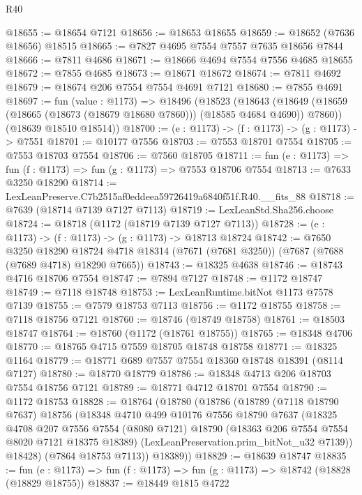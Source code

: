 \begin{lexlean}{R40}
\begin{coremodule}
@18655 := @18654 @7121
@18656 := @18653 @18655
@18659 := @18652 (@7636 @18656) @18515
@18665 := @7827 @4695 @7554 @7557 @7635 @18656 @7844
@18666 := @7811 @4686
@18671 := @18666 @4694 @7554 @7556 @4685 @18655
@18672 := @7855 @4685
@18673 := @18671 @18672
@18674 := @7811 @4692
@18679 := @18674 @206 @7554 @7554 @4691 @7121
@18680 := @7855 @4691
@18697 := fun (value : @1173) =>
  @18496
    (@18523
      (@18643 (@18649 (@18659 (@18665 (@18673 (@18679 @18680 @7860))) (@18585 @4684 @4690)) @7860))
      (@18639 @18510 @18514))
@18700 := (e : @1173) -> (f : @1173) -> (g : @1173) -> @7551
@18701 := @10177 @7556
@18703 := @7553 @18701 @7554
@18705 := @7553 @18703 @7554
@18706 := @7560 @18705
@18711 := fun (e : @1173) => fun (f : @1173) => fun (g : @1173) => @7553 @18706 @7554
@18713 := @7633 @3250 @18290
@18714 := LexLeanPreserve.C7b2515af0eddeea59726419a6840f51f.R40.__fits_88
@18718 := @7639 (@18714 @7139 @7127 @7113)
@18719 := LexLeanStd.Sha256.choose
@18724 := @18718 (@1172 (@18719 @7139 @7127 @7113))
@18728 := (e : @1173) -> (f : @1173) -> (g : @1173) -> @18713 @18724
@18742 := @7650
    @3250
    @18290
    @18724
    @4718
    @18314
    (@7671 (@7681 @3250))
    (@7687 (@7688 (@7689 @4718) @18290 @7665))
@18743 := @18325 @4638
@18746 := @18743 @4716 @18706 @7554
@18747 := @7894 @7127
@18748 := @1172 @18747
@18749 := @7118 @18748
@18753 := LexLeanRuntime.bitNot @1173 @7578 @7139
@18755 := @7579 @18753 @7113
@18756 := @1172 @18755
@18758 := @7118 @18756 @7121
@18760 := @18746 (@18749 @18758)
@18761 := @18503 @18747
@18764 := @18760 (@1172 (@18761 @18755))
@18765 := @18348 @4706
@18770 := @18765 @4715 @7559 @18705 @18748 @18758
@18771 := @18325 @1164
@18779 := @18771 @689 @7557 @7554 @18360 @18748 @18391 (@8114 @7127)
@18780 := @18770 @18779
@18786 := @18348 @4713 @206 @18703 @7554 @18756 @7121
@18789 := @18771 @4712 @18701 @7554
@18790 := @1172 @18753
@18828 := @18764
    (@18780
      (@18786
        (@18789
          (@7118 @18790 @7637)
          @18756
          (@18348
            @4710
            @499
            @10176
            @7556
            @18790
            @7637
            (@18325
              @4708
              @207
              @7556
              @7554
              (@8080 @7121)
              @18790
              (@18363 @206 @7554 @7554 @8020 @7121 @18375 @18389)
              (LexLeanPreservation.prim_bitNot_u32 @7139))
            @18428)
          (@7864 @18753 @7113))
        @18389))
@18829 := @18639 @18747
@18835 := fun (e : @1173) => fun (f : @1173) => fun (g : @1173) => @18742 (@18828 (@18829 @18755))
@18837 := @18449 @1815 @4722

\end{coremodule}
\end{lexlean}
